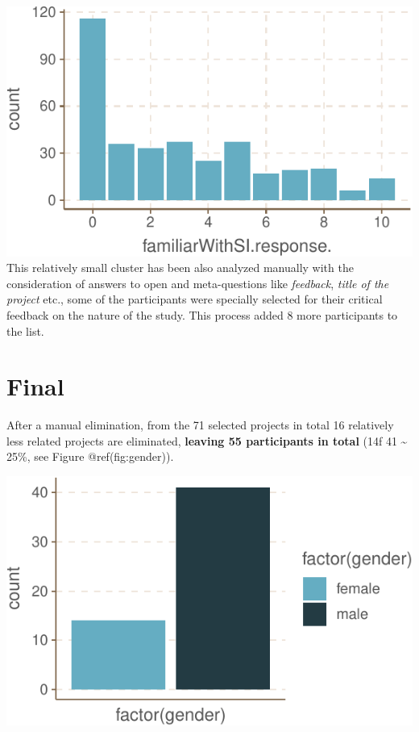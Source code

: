 \documentclass[]{tufte-book}
\begin{document}
\includegraphics{03_SIVOCS_int-cand_files/figure-latex/step4-1} This
relatively small cluster has been also analyzed manually with the
consideration of answers to open and meta-questions like
\emph{feedback}, \emph{title of the project} etc., some of the
participants were specially selected for their critical feedback on the
nature of the study. This process added 8 more participants to the list.

\hypertarget{final}{%
\chapter{Final}\label{final}}

After a manual elimination, from the 71 selected projects in total 16
relatively less related projects are eliminated, \textbf{leaving 55
participants in total} (14f \textbar{} 41 \textasciitilde{} 25\%, see
Figure @ref(fig:gender)).

\includegraphics{03_SIVOCS_int-cand_files/figure-latex/gender-1}
\end{document}
